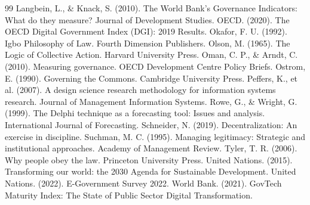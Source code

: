\documentclass[review,onecolumn]{elsarticle}
\begin{document}
\begin{thebibliography}{99}
 Langbein, L., \& Knack, S. (2010). The World Bank’s Governance Indicators: What do they measure? Journal of Development Studies.
 OECD. (2020). The OECD Digital Government Index (DGI): 2019 Results.
 Okafor, F. U. (1992). Igbo Philosophy of Law. Fourth Dimension Publishers.
 Olson, M. (1965). The Logic of Collective Action. Harvard University Press.
 Oman, C. P., \& Arndt, C. (2010). Measuring governance. OECD Development Centre Policy Briefs.
 Ostrom, E. (1990). Governing the Commons. Cambridge University Press.
 Peffers, K., et al. (2007). A design science research methodology for information systems research. Journal of Management Information Systems.
 Rowe, G., \& Wright, G. (1999). The Delphi technique as a forecasting tool: Issues and analysis. International Journal of Forecasting.
 Schneider, N. (2019). Decentralization: An exercise in discipline.
 Suchman, M. C. (1995). Managing legitimacy: Strategic and institutional approaches. Academy of Management Review.
 Tyler, T. R. (2006). Why people obey the law. Princeton University Press.
 United Nations. (2015). Transforming our world: the 2030 Agenda for Sustainable Development.
 United Nations. (2022). E-Government Survey 2022.
 World Bank. (2021). GovTech Maturity Index: The State of Public Sector Digital Transformation.

\end{thebibliography}
\end{document}
